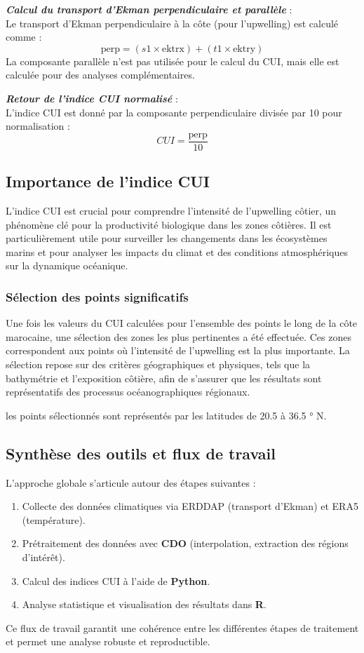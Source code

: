 \textbf{\textit{Calcul du transport d'Ekman perpendiculaire et parallèle}} : \\
   Le transport d'Ekman perpendiculaire à la côte (pour l'upwelling) est calculé comme :
   \[
   \text{perp} = (s1 \times \text{ektrx}) + (t1 \times \text{ektry})
   \]
   La composante parallèle n'est pas utilisée pour le calcul du CUI, mais elle est calculée pour des analyses complémentaires.


\textbf{\textit{Retour de l'indice CUI normalisé}} : \\
   L'indice CUI est donné par la composante perpendiculaire divisée par 10 pour normalisation :
   \[
   CUI = \frac{\text{perp}}{10}
   \]






\subsection{Importance de l'indice CUI}

L'indice CUI est crucial pour comprendre l'intensité de l'upwelling côtier, un phénomène clé pour la productivité biologique dans les zones côtières. Il est particulièrement utile pour surveiller les changements dans les écosystèmes marins et pour analyser les impacts du climat et des conditions atmosphériques sur la dynamique océanique.



\subsubsection{Sélection des points significatifs}
Une fois les valeurs du CUI calculées pour l'ensemble des points le long de la côte marocaine, une sélection des zones les plus pertinentes a été effectuée. Ces zones correspondent aux points où l'intensité de l'upwelling est la plus importante. La sélection repose sur des critères géographiques et physiques, tels que la bathymétrie et l’exposition côtière, afin de s’assurer que les résultats sont représentatifs des processus océanographiques régionaux.

les points sélectionnés sont représentés par les latitudes de 20.5 à 36.5 ° N.


\subsection{Synthèse des outils et flux de travail}
L'approche globale s'articule autour des étapes suivantes :
\begin{enumerate}
    \item Collecte des données climatiques via ERDDAP (transport d'Ekman) et ERA5 (température).
    \item Prétraitement des données avec \textbf{CDO} (interpolation, extraction des régions d'intérêt).
    \item Calcul des indices CUI à l'aide de \textbf{Python}.
    \item Analyse statistique et visualisation des résultats dans \textbf{R}.
\end{enumerate}
Ce flux de travail garantit une cohérence entre les différentes étapes de traitement et permet une analyse robuste et reproductible.

